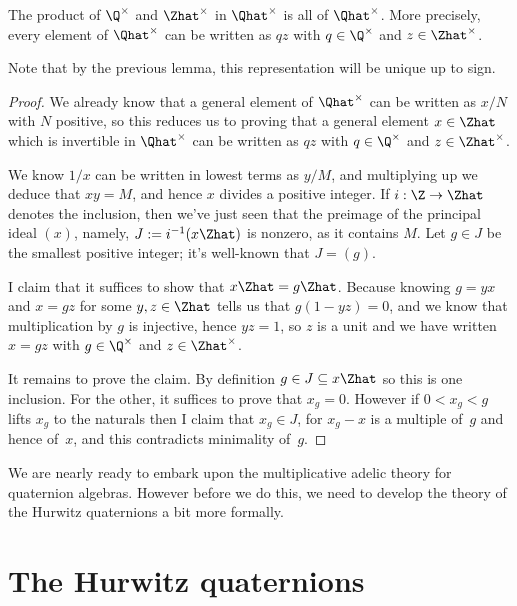 \begin{lemma}
    \label{QHat.unitsrat_join_unitszHat}
    \leanok
    The product of $\Q^\times$ and $\Zhat^\times$ in $\Qhat^\times$ is all of $\Qhat^\times$.
    More precisely, every element of $\Qhat^\times$ can be written as $qz$ with $q\in\Q^\times$
    and $z\in\Zhat^\times$.
\end{lemma}
Note that by the previous lemma, this representation will be unique up to sign.
\begin{proof}
    \leanok
  We already know that a general element of $\Qhat^\times$ can be written as $x/N$ with $N$
  positive, so this reduces us to proving that a general element $x\in\Zhat$ which is invertible
  in $\Qhat^\times$ can be written as $qz$ with $q\in\Q^\times$ and $z\in\Zhat^\times$.

  We know $1/x$ can be written in lowest terms as $y/M$, and multiplying up we deduce
  that $xy=M$, and hence $x$ divides a positive integer. If $i:\Z\to\Zhat$ denotes
  the inclusion, then we've just seen that the preimage of the principal
  ideal $(x)$, namely, $J:=i^{-1}(x\Zhat)$ is nonzero, as it contains $M$.
  Let $g\in J$ be the smallest positive integer; it's well-known that $J=(g)$.

  I claim that it suffices to show that $x\Zhat=g\Zhat$. Because knowing $g=yx$ and
  $x=gz$ for some $y,z\in\Zhat$ tells us that $g(1-yz)=0$, and we know that multiplication by $g$ is injective,
  hence $yz=1$, so $z$ is a unit and we have written $x=gz$ with $g\in\Q^\times$ and $z\in\Zhat^\times$.

  It remains to prove the claim. By definition $g\in J\subseteq x\Zhat$ so this is one
  inclusion. For the other, it suffices to prove that $x_g=0$. However if $0<x_g<g$
  lifts $x_g$ to the naturals then I claim that $x_g\in J$, for $x_g-x$ is a multiple
  of~$g$ and hence of~$x$, and this contradicts minimality of~$g$.
\end{proof}

We are nearly ready to embark upon the multiplicative adelic theory for quaternion algebras.
However before we do this, we need to develop the theory of the Hurwitz quaternions a bit
more formally.

\section{The Hurwitz quaternions}

